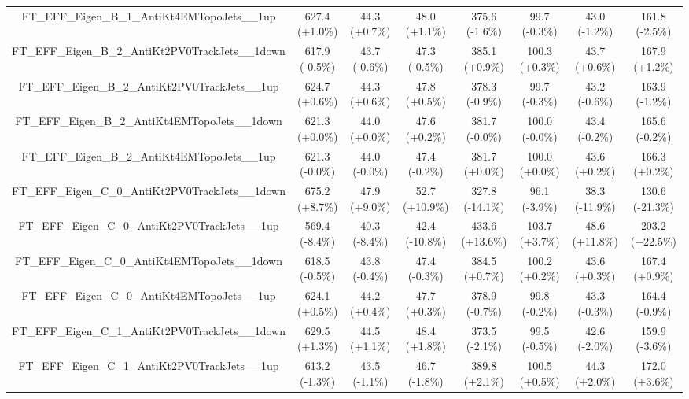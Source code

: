 \begin{table}[htbp!]
\begin{tiny}
\begin{center}
\begin{tabular}{c|c|c|c||c|c|c|c}
FT\_EFF\_Eigen\_B\_1\_AntiKt4EMTopoJets\_\_1up               & 627.4     (+1.0\%) & 44.3      (+0.7\%) & 48.0      (+1.1\%) & 375.6     (-1.6\%) & 99.7      (-0.3\%) & 43.0      (-1.2\%) & 161.8     (-2.5\%) \\ 
FT\_EFF\_Eigen\_B\_2\_AntiKt2PV0TrackJets\_\_1down           & 617.9     (-0.5\%) & 43.7      (-0.6\%) & 47.3      (-0.5\%) & 385.1     (+0.9\%) & 100.3     (+0.3\%) & 43.7      (+0.6\%) & 167.9     (+1.2\%) \\ 
FT\_EFF\_Eigen\_B\_2\_AntiKt2PV0TrackJets\_\_1up             & 624.7     (+0.6\%) & 44.3      (+0.6\%) & 47.8      (+0.5\%) & 378.3     (-0.9\%) & 99.7      (-0.3\%) & 43.2      (-0.6\%) & 163.9     (-1.2\%) \\ 
FT\_EFF\_Eigen\_B\_2\_AntiKt4EMTopoJets\_\_1down             & 621.3     (+0.0\%) & 44.0      (+0.0\%) & 47.6      (+0.2\%) & 381.7     (-0.0\%) & 100.0     (-0.0\%) & 43.4      (-0.2\%) & 165.6     (-0.2\%) \\ 
FT\_EFF\_Eigen\_B\_2\_AntiKt4EMTopoJets\_\_1up               & 621.3     (-0.0\%) & 44.0      (-0.0\%) & 47.4      (-0.2\%) & 381.7     (+0.0\%) & 100.0     (+0.0\%) & 43.6      (+0.2\%) & 166.3     (+0.2\%) \\ 
FT\_EFF\_Eigen\_C\_0\_AntiKt2PV0TrackJets\_\_1down           & 675.2     (+8.7\%) & 47.9      (+9.0\%) & 52.7      (+10.9\%) & 327.8     (-14.1\%) & 96.1      (-3.9\%) & 38.3      (-11.9\%) & 130.6     (-21.3\%) \\ 
FT\_EFF\_Eigen\_C\_0\_AntiKt2PV0TrackJets\_\_1up             & 569.4     (-8.4\%) & 40.3      (-8.4\%) & 42.4      (-10.8\%) & 433.6     (+13.6\%) & 103.7     (+3.7\%) & 48.6      (+11.8\%) & 203.2     (+22.5\%) \\ 
FT\_EFF\_Eigen\_C\_0\_AntiKt4EMTopoJets\_\_1down             & 618.5     (-0.5\%) & 43.8      (-0.4\%) & 47.4      (-0.3\%) & 384.5     (+0.7\%) & 100.2     (+0.2\%) & 43.6      (+0.3\%) & 167.4     (+0.9\%) \\ 
FT\_EFF\_Eigen\_C\_0\_AntiKt4EMTopoJets\_\_1up               & 624.1     (+0.5\%) & 44.2      (+0.4\%) & 47.7      (+0.3\%) & 378.9     (-0.7\%) & 99.8      (-0.2\%) & 43.3      (-0.3\%) & 164.4     (-0.9\%) \\ 
FT\_EFF\_Eigen\_C\_1\_AntiKt2PV0TrackJets\_\_1down           & 629.5     (+1.3\%) & 44.5      (+1.1\%) & 48.4      (+1.8\%) & 373.5     (-2.1\%) & 99.5      (-0.5\%) & 42.6      (-2.0\%) & 159.9     (-3.6\%) \\ 
FT\_EFF\_Eigen\_C\_1\_AntiKt2PV0TrackJets\_\_1up             & 613.2     (-1.3\%) & 43.5      (-1.1\%) & 46.7      (-1.8\%) & 389.8     (+2.1\%) & 100.5     (+0.5\%) & 44.3      (+2.0\%) & 172.0     (+3.6\%) \\ 

\end{tabular}
\end{center}
\end{tiny}
\end{table}
